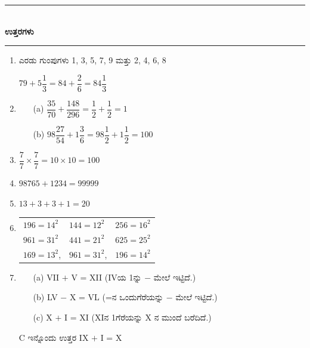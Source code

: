 \smallskip

\begin{center}
\rule{5cm}{1pt}\\[3pt]
{\Large\bfseries ಉತ್ತರಗಳು}\\[-0.1cm]
\rule{5cm}{1pt}
\end{center}

\begin{enumerate}
\item ಎರಡು ಗುಂಪುಗಳು 1, 3, 5, 7, 9 ಮತ್ತು 2, 4, 6, 8

$79 + 5\dfrac{1}{3} = 84 + \dfrac{2}{6} = 84\dfrac{1}{3}$

\item 
\begin{itemize}
\item[(a)] $\dfrac{35}{70} + \dfrac{148}{296} = \dfrac{1}{2} + \dfrac{1}{2} = 1$
\item[(b)] $98 \dfrac{27}{54} + 1\dfrac{3}{6} = 98\dfrac{1}{2} + 1\dfrac{1}{2} = 100$
\end{itemize}

\item $\dfrac{7}{7}\times \dfrac{7}{7} = 10\times 10 = 100$

\smallskip
\item $98765 + 1234 = 99999$

\item $13 + 3 + 3 + 1 = 20$

\item 

\begin{tabular}[t]{lll}
$196 = 14^{2}$ & $144 = 12^{2}$ & $256 = 16^{2}$\\
$961 = 31^{2}$ & $441 = 21^{2}$ & $625 = 25^{2}$\\
$169 = 13^{2}$, & $961 = 31^{2}$, & $196 = 14^{2}$
\end{tabular}

\item 
\begin{itemize}
\item[(a)] VII $+$ V = XII (IVಯ 1ನ್ನು $-$ ಮೇಲೆ ಇಟ್ಟಿದೆ.)
\item[(b)] LV $-$ X = VL (=ನ ಒಂದುಗೆರೆಯನ್ನು $-$ ಮೇಲೆ ಇಟ್ಟಿದೆ.)
\item[(c)] X $+$ I = XI (XIನ 1ಗೆರೆಯನ್ನು X ನ ಮುಂದೆ ಬರೆದಿದೆ.)
\end{itemize}

C ಇನ್ನೊಂದು ಉತ್ತರ IX $+$ I = X


\end{enumerate}
